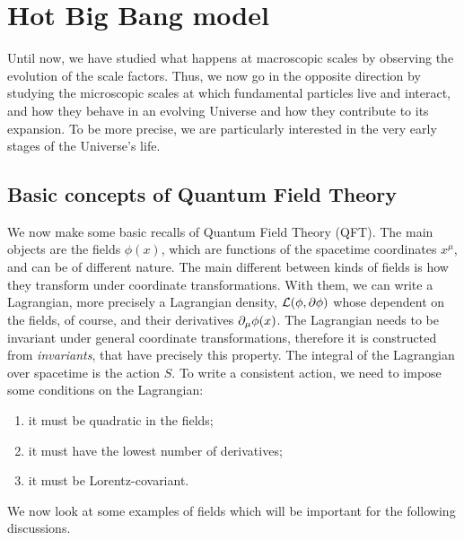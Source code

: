 \chapter{Hot Big Bang model}
Until now, we have studied what happens at macroscopic scales by observing the evolution of the scale factors. Thus, we now go in the opposite direction by studying the microscopic scales at which fundamental particles live and interact, and how they behave in an evolving Universe and how they contribute to its expansion. To be more precise, we are particularly interested in the very early stages of the Universe's life. 

\section{Basic concepts of Quantum Field Theory}
We now make some basic recalls of Quantum Field Theory (QFT). The main objects are the fields $\phi(x)$, which are functions of the spacetime coordinates $x^\mu$, and can be of different nature. The main different between kinds of fields is how they transform under coordinate transformations. With them, we can write a Lagrangian, more precisely a Lagrangian density, $\mathcal{L}(\phi,\partial\phi)$ whose dependent on the fields, of course, and their derivatives $\partial_\mu\phi(x)$. The Lagrangian needs to be invariant under general coordinate transformations, therefore it is constructed from \emph{invariants}, that have precisely this property. The integral of the Lagrangian over spacetime is the action $S$. To write a consistent action, we need to impose some conditions on the Lagrangian:
\begin{enumerate}
    \item it must be quadratic in the fields;
    \item it must have the lowest number of derivatives;
    \item it must be Lorentz-covariant.
\end{enumerate}
We now look at some examples of fields which will be important for the following discussions.

